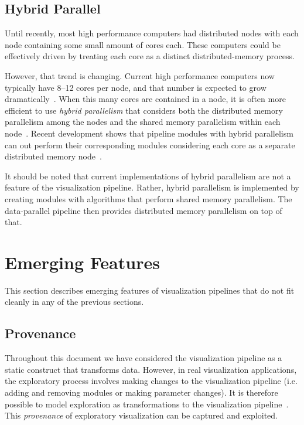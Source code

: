 \documentclass[journal,twocolumn,10pt,letterpaper,twoside]{IEEEtran}
\newcommand*{\lcite}[1]{~\cite{#1}}
\newcommand*{\keyterm}[1]{\emph{#1}}
\begin{document}
\subsection{Hybrid Parallel}
\label{sec:HybridParallel}

Until recently, most high performance computers had distributed nodes with
each node containing some small amount of cores each.  These computers
could be effectively driven by treating each core as a distinct
distributed-memory process.

However, that trend is changing.  Current high performance computers now
typically have 8--12 cores per node, and that number is expected to grow
dramatically\lcite{ExascaleRoadMap,ASCACSummaryReport2010,ScientificDiscoveryExascale2011}.
When this many cores are contained in a node, it is often more efficient to
use \keyterm{hybrid parallelism} that considers both the distributed memory
parallelism among the nodes and the shared memory parallelism within each
node\lcite{Cappello2000}.  Recent development shows that pipeline
modules with hybrid parallelism can out perform their corresponding
modules considering each core as a separate distributed memory
node\lcite{Li2008,Camp2010,Howison2011}.

It should be noted that current implementations of hybrid parallelism are
not a feature of the visualization pipeline.  Rather, hybrid parallelism is
implemented by creating modules with algorithms that perform shared
memory parallelism.  The data-parallel pipeline then provides distributed
memory parallelism on top of that.

\section{Emerging Features}
\label{sec:EmergingFeatures}

This section describes emerging features of visualization pipelines that do
not fit cleanly in any of the previous sections.

\subsection{Provenance}
\label{sec:Provenance}

Throughout this document we have considered the visualization pipeline as a
static construct that transforms data.  However, in real visualization
applications, the exploratory process involves making changes to the
visualization pipeline (i.e. adding and removing modules or making
parameter changes).  It is therefore possible to model exploration as
transformations to the visualization pipeline\lcite{JankunKelly2002}.  This
\keyterm{provenance} of exploratory visualization can be captured and
exploited.
\end{document}
